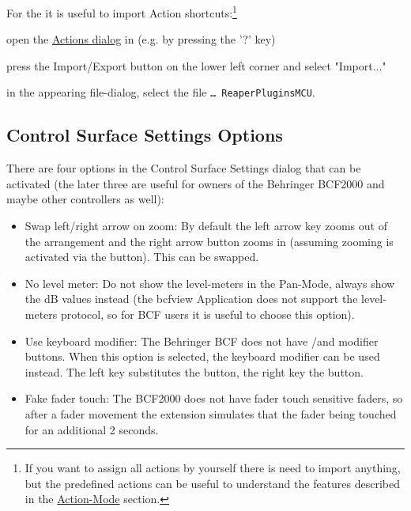 \noindent
For the \actionmode it is useful to import Action
shortcuts:\footnote{If you want to assign all actions by yourself
  there is need to import anything, but  the predefined actions can be
  useful to understand the features described in the
  \hyperref[actionmode]{Action-Mode} section.}
 
\begin{compactitem}
\item open the \hyperref[F:actiondialog]{Actions dialog} in
  \reaper(e.g. by pressing the '?' key)
\item press the Import/Export button on the lower left corner and select
  "Import..."
\item in the appearing file-dialog, select the file {\tt \ldots\tbs
    Reaper\tbs Plugins\tbs MCU}.
\end{compactitem}

\subsection{Control Surface Settings Options}\label{settings}
There are four options in the Control Surface Settings dialog that can
be activated (the later three are useful for owners of the Behringer
BCF2000 and maybe other controllers as well):
\begin{itemize}
\item Swap left/right arrow on zoom: By default the left arrow key
  zooms out of the arrangement and the right arrow button zooms in (assuming
  zooming is activated via the \zoom button). This can be swapped.

\item No level meter: Do not show the level-meters in the Pan-Mode,
  always show the dB values instead (the bcfview Application does not
  support the level-meters protocol, so for BCF users it is useful to
  choose this option).
\item Use keyboard modifier: The Behringer BCF does not have 
  \option/\control and \alt modifier buttons. When this option is
  selected, the keyboard modifier can be used instead. The left
  \alt key substitutes the \alt button, the right \alt key the
  \option button.
\item Fake fader touch: The BCF2000 does not have fader touch sensitive
  faders, so after a fader movement the extension simulates that the
  fader being touched for an additional 2 seconds.
\end{itemize}


